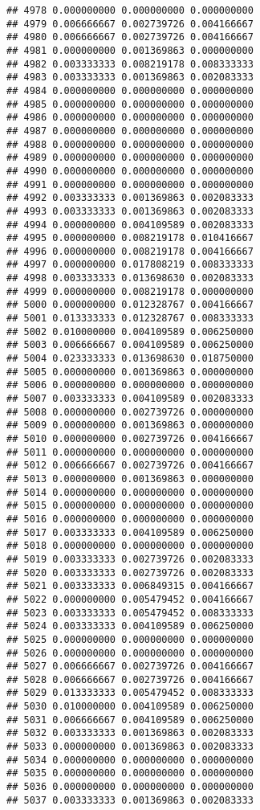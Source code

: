 \documentclass[
]{article}
\begin{document}
\begin{verbatim}
## 4978 0.000000000 0.000000000 0.000000000
## 4979 0.006666667 0.002739726 0.004166667
## 4980 0.006666667 0.002739726 0.004166667
## 4981 0.000000000 0.001369863 0.000000000
## 4982 0.003333333 0.008219178 0.008333333
## 4983 0.003333333 0.001369863 0.002083333
## 4984 0.000000000 0.000000000 0.000000000
## 4985 0.000000000 0.000000000 0.000000000
## 4986 0.000000000 0.000000000 0.000000000
## 4987 0.000000000 0.000000000 0.000000000
## 4988 0.000000000 0.000000000 0.000000000
## 4989 0.000000000 0.000000000 0.000000000
## 4990 0.000000000 0.000000000 0.000000000
## 4991 0.000000000 0.000000000 0.000000000
## 4992 0.003333333 0.001369863 0.002083333
## 4993 0.003333333 0.001369863 0.002083333
## 4994 0.000000000 0.004109589 0.002083333
## 4995 0.000000000 0.008219178 0.010416667
## 4996 0.000000000 0.008219178 0.004166667
## 4997 0.000000000 0.017808219 0.008333333
## 4998 0.003333333 0.013698630 0.002083333
## 4999 0.000000000 0.008219178 0.000000000
## 5000 0.000000000 0.012328767 0.004166667
## 5001 0.013333333 0.012328767 0.008333333
## 5002 0.010000000 0.004109589 0.006250000
## 5003 0.006666667 0.004109589 0.006250000
## 5004 0.023333333 0.013698630 0.018750000
## 5005 0.000000000 0.001369863 0.000000000
## 5006 0.000000000 0.000000000 0.000000000
## 5007 0.003333333 0.004109589 0.002083333
## 5008 0.000000000 0.002739726 0.000000000
## 5009 0.000000000 0.001369863 0.000000000
## 5010 0.000000000 0.002739726 0.004166667
## 5011 0.000000000 0.000000000 0.000000000
## 5012 0.006666667 0.002739726 0.004166667
## 5013 0.000000000 0.001369863 0.000000000
## 5014 0.000000000 0.000000000 0.000000000
## 5015 0.000000000 0.000000000 0.000000000
## 5016 0.000000000 0.000000000 0.000000000
## 5017 0.003333333 0.004109589 0.006250000
## 5018 0.000000000 0.000000000 0.000000000
## 5019 0.003333333 0.002739726 0.002083333
## 5020 0.003333333 0.002739726 0.002083333
## 5021 0.003333333 0.006849315 0.004166667
## 5022 0.000000000 0.005479452 0.004166667
## 5023 0.003333333 0.005479452 0.008333333
## 5024 0.003333333 0.004109589 0.006250000
## 5025 0.000000000 0.000000000 0.000000000
## 5026 0.000000000 0.000000000 0.000000000
## 5027 0.006666667 0.002739726 0.004166667
## 5028 0.006666667 0.002739726 0.004166667
## 5029 0.013333333 0.005479452 0.008333333
## 5030 0.010000000 0.004109589 0.006250000
## 5031 0.006666667 0.004109589 0.006250000
## 5032 0.003333333 0.001369863 0.002083333
## 5033 0.000000000 0.001369863 0.002083333
## 5034 0.000000000 0.000000000 0.000000000
## 5035 0.000000000 0.000000000 0.000000000
## 5036 0.000000000 0.000000000 0.000000000
## 5037 0.003333333 0.001369863 0.002083333

\end{verbatim}
\end{document}
